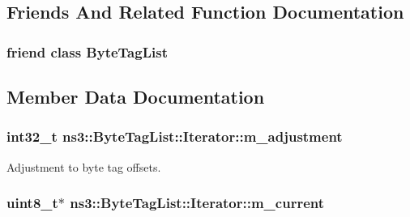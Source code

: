 \subsection{Friends And Related Function Documentation}
\subsubsection[{\texorpdfstring{Byte\+Tag\+List}{ByteTagList}}]{\setlength{\rightskip}{0pt plus 5cm}friend class {\bf Byte\+Tag\+List}\hspace{0.3cm}{\ttfamily [friend]}}\hypertarget{classns3_1_1ByteTagList_1_1Iterator_a638c63b97c2e0e6a3bea307fe39c6093}{}\label{classns3_1_1ByteTagList_1_1Iterator_a638c63b97c2e0e6a3bea307fe39c6093}


\subsection{Member Data Documentation}
\subsubsection[{\texorpdfstring{m\+\_\+adjustment}{m_adjustment}}]{\setlength{\rightskip}{0pt plus 5cm}int32\+\_\+t ns3\+::\+Byte\+Tag\+List\+::\+Iterator\+::m\+\_\+adjustment\hspace{0.3cm}{\ttfamily [private]}}\hypertarget{classns3_1_1ByteTagList_1_1Iterator_a1a2f740d59491d621690a0480c76a056}{}\label{classns3_1_1ByteTagList_1_1Iterator_a1a2f740d59491d621690a0480c76a056}


Adjustment to byte tag offsets. 

\subsubsection[{\texorpdfstring{m\+\_\+current}{m_current}}]{\setlength{\rightskip}{0pt plus 5cm}uint8\+\_\+t$\ast$ ns3\+::\+Byte\+Tag\+List\+::\+Iterator\+::m\+\_\+current\hspace{0.3cm}{\ttfamily [private]}}\hypertarget{classns3_1_1ByteTagList_1_1Iterator_a12d17a309f11f53143033cb31a351fa6}{}\label{classns3_1_1ByteTagList_1_1Iterator_a12d17a309f11f53143033cb31a351fa6}


